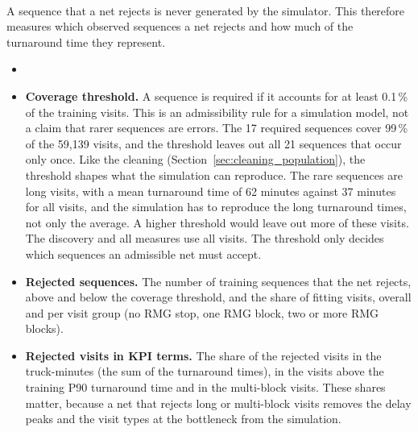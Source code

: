 \paragraph{}
A sequence that a net rejects is never generated by the simulator. This 
therefore measures which observed sequences a net rejects and how much of the
turnaround time they represent.
\begin{itemize}
\item {}
\item \textbf{Coverage threshold.} A sequence is required if it accounts for at
least 0.1\,\% of the training visits. This is an admissibility rule for a
simulation model, not a claim that rarer sequences are errors. The 17 required
sequences cover 99\,\% of the 59,139 visits, and the threshold leaves out all 21
sequences that occur only once. Like the cleaning
(Section~\ref{sec:cleaning_population}), the threshold shapes what the simulation
can reproduce. The rare sequences are long visits, with a mean turnaround time of
62 minutes against 37 minutes for all visits, and the simulation has to reproduce
the long turnaround times, not only the average. A higher threshold would leave
out more of these visits. The discovery and all measures use all visits. The
threshold only decides which sequences an admissible net must accept.
\item \textbf{Rejected sequences.} The number of training sequences that the net
rejects, above and below the coverage threshold, and the share of fitting visits,
overall and per visit group (no RMG stop, one RMG block, two or more RMG blocks).
\item \textbf{Rejected visits in KPI terms.} The share of the rejected visits in
the truck-minutes (the sum of the turnaround times), in the visits above the
training P90 turnaround time and in the multi-block visits. These shares matter,
because a net that rejects long or multi-block visits removes the delay peaks and
the visit types at the bottleneck from the simulation.
\end{itemize}

